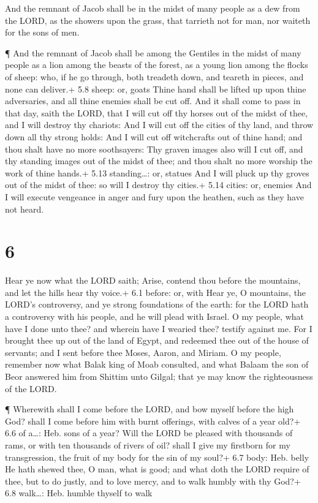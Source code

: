  And the remnant of Jacob shall be in the midst of many
people as a dew from the LORD, as the showers upon the grass, that
tarrieth not for man, nor waiteth for the sons of men.

 ¶ And the remnant of Jacob shall be among the Gentiles in
the midst of many people as a lion among the beasts of the forest, as a
young lion among the flocks of sheep: who, if he go through, both
treadeth down, and teareth in pieces, and none can deliver.+ 5.8 sheep:
or, goats  Thine hand shall be lifted up upon thine
adversaries, and all thine enemies shall be cut off.  And
it shall come to pass in that day, saith the LORD, that I will cut off
thy horses out of the midst of thee, and I will destroy thy chariots:
 And I will cut off the cities of thy land, and throw down
all thy strong holds:  And I will cut off witchcrafts out
of thine hand; and thou shalt have no more soothsayers: 
Thy graven images also will I cut off, and thy standing images out of
the midst of thee; and thou shalt no more worship the work of thine
hands.+ 5.13 standing\ldots: or, statues  And I will pluck
up thy groves out of the midst of thee: so will I destroy thy cities.+
5.14 cities: or, enemies  And I will execute vengeance in
anger and fury upon the heathen, such as they have not heard.

\hypertarget{section-5}{%
\section{6}\label{section-5}}

 Hear ye now what the LORD saith; Arise, contend thou before
the mountains, and let the hills hear thy voice.+ 6.1 before: or, with
 Hear ye, O mountains, the LORD's controversy, and ye strong
foundations of the earth: for the LORD hath a controversy with his
people, and he will plead with Israel.  O my people, what
have I done unto thee? and wherein have I wearied thee? testify against
me.  For I brought thee up out of the land of Egypt, and
redeemed thee out of the house of servants; and I sent before thee
Moses, Aaron, and Miriam.  O my people, remember now what
Balak king of Moab consulted, and what Balaam the son of Beor answered
him from Shittim unto Gilgal; that ye may know the righteousness of the
LORD.

 ¶ Wherewith shall I come before the LORD, and bow myself
before the high God? shall I come before him with burnt offerings, with
calves of a year old?+ 6.6 of a\ldots: Heb. sons of a year? 
Will the LORD be pleased with thousands of rams, or with ten thousands
of rivers of oil? shall I give my firstborn for my transgression, the
fruit of my body for the sin of my soul?+ 6.7 body: Heb. belly
 He hath shewed thee, O man, what is good; and what doth the
LORD require of thee, but to do justly, and to love mercy, and to walk
humbly with thy God?+ 6.8 walk\ldots: Heb. humble thyself to walk

